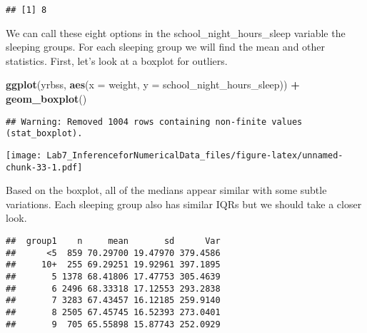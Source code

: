 \documentclass[
]{article}
\newenvironment{Shaded}{\begin{snugshade}}{\end{snugshade}}
\newcommand{\DataTypeTok}[1]{\textcolor[rgb]{0.13,0.29,0.53}{#1}}
\newcommand{\DecValTok}[1]{\textcolor[rgb]{0.00,0.00,0.81}{#1}}
\newcommand{\KeywordTok}[1]{\textcolor[rgb]{0.13,0.29,0.53}{\textbf{#1}}}
\newcommand{\NormalTok}[1]{#1}
\newcommand{\OperatorTok}[1]{\textcolor[rgb]{0.81,0.36,0.00}{\textbf{#1}}}
\newcommand{\OtherTok}[1]{\textcolor[rgb]{0.56,0.35,0.01}{#1}}
\newcommand{\StringTok}[1]{\textcolor[rgb]{0.31,0.60,0.02}{#1}}
\begin{document}
\begin{verbatim}
## [1] 8
\end{verbatim}

We can call these eight options in the school\_night\_hours\_sleep
variable the sleeping groups. For each sleeping group we will find the
mean and other statistics. First, let's look at a boxplot for outliers.

\begin{Shaded}
\begin{Highlighting}[]
\KeywordTok{ggplot}\NormalTok{(yrbss, }\KeywordTok{aes}\NormalTok{(}\DataTypeTok{x =}\NormalTok{ weight, }\DataTypeTok{y =}\NormalTok{ school_night_hours_sleep)) }\OperatorTok{+}\StringTok{ }\KeywordTok{geom_boxplot}\NormalTok{()}
\end{Highlighting}
\end{Shaded}

\begin{verbatim}
## Warning: Removed 1004 rows containing non-finite values (stat_boxplot).
\end{verbatim}

\texttt{[image: Lab7\_InferenceforNumericalData\_files/figure-latex/unnamed-chunk-33-1.pdf]}

Based on the boxplot, all of the medians appear similar with some subtle
variations. Each sleeping group also has similar IQRs but we should take
a closer look.

\begin{Shaded}
\end{Shaded}

\begin{verbatim}
##  group1    n     mean       sd      Var
##      <5  859 70.29700 19.47970 379.4586
##     10+  255 69.29251 19.92961 397.1895
##       5 1378 68.41806 17.47753 305.4639
##       6 2496 68.33318 17.12553 293.2838
##       7 3283 67.43457 16.12185 259.9140
##       8 2505 67.45745 16.52393 273.0401
##       9  705 65.55898 15.87743 252.0929
\end{verbatim}
\end{document}
